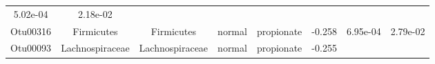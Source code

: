 \documentclass[11pt,]{article}
\begin{document}
\begin{longtable}[]{@{}cccccccc@{}}
\begin{minipage}[t]{0.08\columnwidth}
5.02e-04\strut
\end{minipage} & \begin{minipage}[t]{0.08\columnwidth}\centering\strut
2.18e-02\strut
\end{minipage}\tabularnewline
\begin{minipage}[t]{0.08\columnwidth}\centering\strut
Otu00316\strut
\end{minipage} & \begin{minipage}[t]{0.15\columnwidth}\centering\strut
Firmicutes\strut
\end{minipage} & \begin{minipage}[t]{0.15\columnwidth}\centering\strut
Firmicutes\strut
\end{minipage} & \begin{minipage}[t]{0.08\columnwidth}\centering\strut
normal\strut
\end{minipage} & \begin{minipage}[t]{0.09\columnwidth}\centering\strut
propionate\strut
\end{minipage} & \begin{minipage}[t]{0.07\columnwidth}\centering\strut
-0.258\strut
\end{minipage} & \begin{minipage}[t]{0.08\columnwidth}\centering\strut
6.95e-04\strut
\end{minipage} & \begin{minipage}[t]{0.08\columnwidth}\centering\strut
2.79e-02\strut
\end{minipage}\tabularnewline
\begin{minipage}[t]{0.08\columnwidth}\centering\strut
Otu00093\strut
\end{minipage} & \begin{minipage}[t]{0.15\columnwidth}\centering\strut
Lachnospiraceae\strut
\end{minipage} & \begin{minipage}[t]{0.15\columnwidth}\centering\strut
Lachnospiraceae\strut
\end{minipage} & \begin{minipage}[t]{0.08\columnwidth}\centering\strut
normal\strut
\end{minipage} & \begin{minipage}[t]{0.09\columnwidth}\centering\strut
propionate\strut
\end{minipage} & \begin{minipage}[t]{0.07\columnwidth}\centering\strut
-0.255\strut
\end{minipage} & \begin{minipage}[t]{0.08\columnwidth}\centering\strut

\end{minipage}
\end{longtable}
\end{document}
